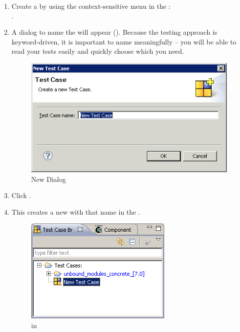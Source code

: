 \begin{enumerate}
\item Create a \gdcase{} by using the context-sensitive menu in the \gdtestcasebrowser{}:\\
.

\item A dialog to name the \gdcase{} will appear (). Because the testing approach is keyword-driven, it is important to name \gdcases{} meaningfully --  you will be able to read your tests easily and quickly choose which \gdcase{} you need. 

\begin{figure}[h]
\begin{center}
\includegraphics[width=12.5cm]{Tasks/Testcases/PS/newtestcasedialog}
\caption{New \gdcase{} Dialog}
\label{newtestcasedialog}
\end{center}
\end{figure} 

\item Click . 
\item This creates a new \gdcase{} with that name in the \gdtestcasebrowser{} .

\begin{figure}[h]
\begin{center}
\includegraphics{Tasks/Testcases/PS/newtestcaseinbrowser}
\caption{\gdcase{} in \gdtestcasebrowser{}}
\label{newtestcaseinbrowser}
\end{center}
\end{figure} 

\end{enumerate}

